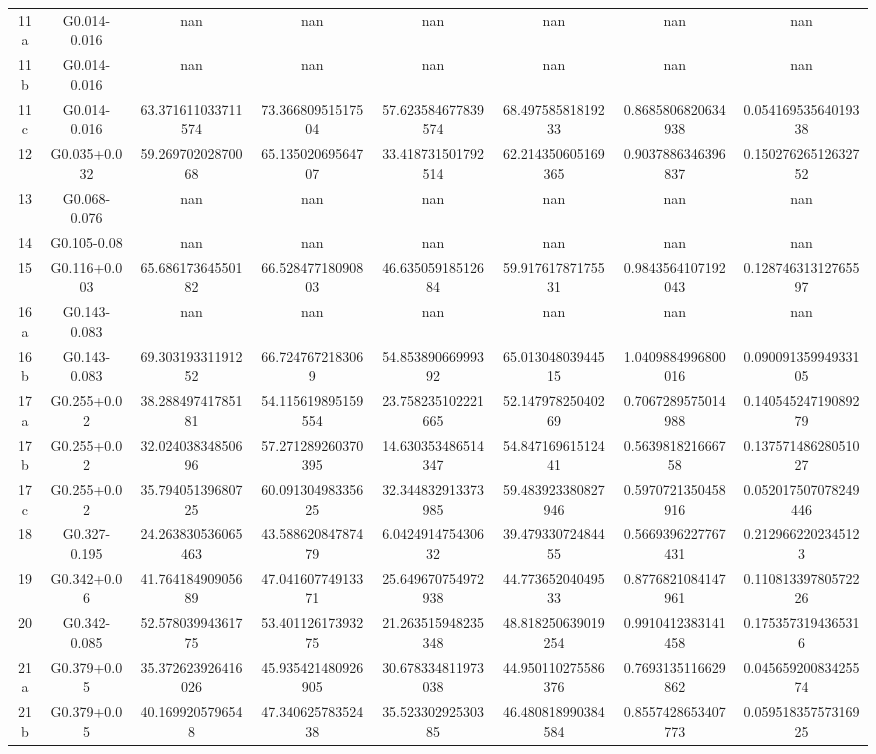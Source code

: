 \begin{table}
\begin{tabular}{cccccccc}
11a & G0.014-0.016 & nan & nan & nan & nan & nan & nan \\
11b & G0.014-0.016 & nan & nan & nan & nan & nan & nan \\
11c & G0.014-0.016 & 63.371611033711574 & 73.36680951517504 & 57.623584677839574 & 68.49758581819233 & 0.8685806820634938 & 0.05416953564019338 \\
12 & G0.035+0.032 & 59.26970202870068 & 65.13502069564707 & 33.418731501792514 & 62.214350605169365 & 0.9037886346396837 & 0.15027626512632752 \\
13 & G0.068-0.076 & nan & nan & nan & nan & nan & nan \\
14 & G0.105-0.08 & nan & nan & nan & nan & nan & nan \\
15 & G0.116+0.003 & 65.68617364550182 & 66.52847718090803 & 46.63505918512684 & 59.91761787175531 & 0.9843564107192043 & 0.12874631312765597 \\
16a & G0.143-0.083 & nan & nan & nan & nan & nan & nan \\
16b & G0.143-0.083 & 69.30319331191252 & 66.7247672183069 & 54.85389066999392 & 65.01304803944515 & 1.0409884996800016 & 0.09009135994933105 \\
17a & G0.255+0.02 & 38.28849741785181 & 54.115619895159554 & 23.758235102221665 & 52.14797825040269 & 0.7067289575014988 & 0.14054524719089279 \\
17b & G0.255+0.02 & 32.02403834850696 & 57.271289260370395 & 14.630353486514347 & 54.84716961512441 & 0.563981821666758 & 0.13757148628051027 \\
17c & G0.255+0.02 & 35.79405139680725 & 60.09130498335625 & 32.344832913373985 & 59.483923380827946 & 0.5970721350458916 & 0.052017507078249446 \\
18 & G0.327-0.195 & 24.263830536065463 & 43.58862084787479 & 6.042491475430632 & 39.47933072484455 & 0.5669396227767431 & 0.2129662202345123 \\
19 & G0.342+0.06 & 41.76418490905689 & 47.04160774913371 & 25.649670754972938 & 44.77365204049533 & 0.8776821084147961 & 0.11081339780572226 \\
20 & G0.342-0.085 & 52.57803994361775 & 53.40112617393275 & 21.263515948235348 & 48.818250639019254 & 0.9910412383141458 & 0.1753573194365316 \\
21a & G0.379+0.05 & 35.372623926416026 & 45.935421480926905 & 30.678334811973038 & 44.950110275586376 & 0.7693135116629862 & 0.04565920083425574 \\
21b & G0.379+0.05 & 40.1699205796548 & 47.34062578352438 & 35.52330292530385 & 46.480818990384584 & 0.8557428653407773 & 0.05951835757316925 \\

\end{tabular}
\end{table}
